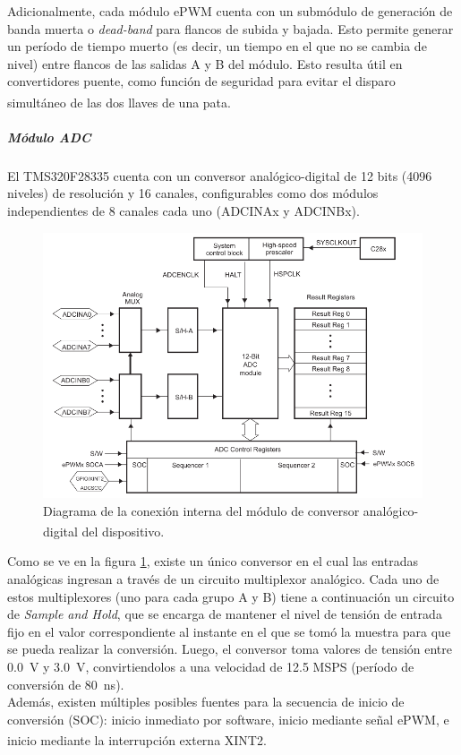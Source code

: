 Adicionalmente, cada módulo ePWM cuenta con un submódulo de generación de banda muerta o \textit{dead-band} para flancos de subida y bajada. Esto permite generar un período de tiempo muerto (es decir, un tiempo en el que no se cambia de nivel) entre flancos de las salidas A y B del módulo. Esto resulta útil en convertidores puente, como función de seguridad para evitar el disparo simultáneo de las dos llaves de una pata.\textsuperscript{\cite{DSP-TechManual}}\\

\subparagraph{Módulo ADC}

El TMS320F28335 cuenta con un conversor analógico-digital de 12 bits (4096 niveles) de resolución y 16 canales, configurables como dos módulos independientes de 8 canales cada uno (ADCINAx y ADCINBx).

\begin{figure}[h]
    \centering
    \includegraphics[scale=0.4]{Imagenes/Modulo ADC.png}
    \caption{Diagrama de la conexión interna del módulo de conversor analógico-digital del dispositivo.\textsuperscript{\cite{DSP-TechManual}}}
    \label{Modulo-ADC}
\end{figure}

Como se ve en la figura \ref{Modulo-ADC}, existe un único conversor en el cual las entradas analógicas ingresan a través de un circuito multiplexor analógico. Cada uno de estos multiplexores (uno para cada grupo A y B) tiene a continuación un circuito de \textit{Sample and Hold}, que se encarga de mantener el nivel de tensión de entrada fijo en el valor correspondiente al instante en el que se tomó la muestra para que se pueda realizar la conversión. Luego, el conversor toma valores de tensión entre \SI[]{0.0}{\volt} y \SI[]{3.0}{\volt}, convirtiendolos a una velocidad de \num[]{12.5} MSPS (período de conversión de \SI[]{80}{\nano\second}).\\

Además, existen múltiples posibles fuentes para la secuencia de inicio de conversión (SOC): inicio inmediato por software, inicio mediante señal ePWM, e inicio mediante la interrupción externa XINT2.\textsuperscript{\cite{DSP-Datasheet}}\\
